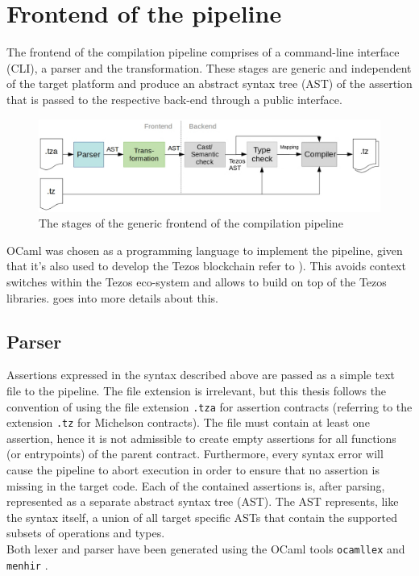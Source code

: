 \section{Frontend of the pipeline}\label{sec:pipeline_front}
The frontend of the compilation pipeline comprises of a command-line interface (CLI), a parser and the transformation. These stages are generic and independent of the target platform and produce an abstract syntax tree (AST) of the assertion that is passed to the respective back-end through a public interface.
\begin{figure}[h]
\includegraphics[width=\linewidth]{figures/3-offline/pipeline_frontend}
\caption{The stages of the generic frontend of the compilation pipeline}
\label{fig:pipeline_frontend}
\end{figure}
OCaml was chosen as a programming language to implement the pipeline, given that it's also used to develop the Tezos blockchain refer to ). This avoids context switches within the Tezos eco-system and allows to build on top of the Tezos libraries.  goes into more details about this.

\subsection{Parser}
Assertions expressed in the syntax described above are passed as a simple text file to the pipeline. The file extension is irrelevant, but this thesis follows the convention of using the file extension \texttt{.tza} for assertion contracts (referring to the extension \texttt{.tz} for Michelson contracts). The file must contain at least one assertion, hence it is not admissible to create empty assertions for all functions (or entrypoints) of the parent contract. Furthermore, every syntax error will cause the pipeline to abort execution in order to ensure that no assertion is missing in the target code. Each of the contained assertions is, after parsing, represented as a separate abstract syntax tree (AST). The AST represents, like the syntax itself, a union of all target specific ASTs that contain the supported subsets of operations and types. \\
Both lexer and parser have been generated using the OCaml tools \texttt{ocamllex} \cite{ocaml_docs} and \texttt{menhir} \cite{menhir_doc}.

